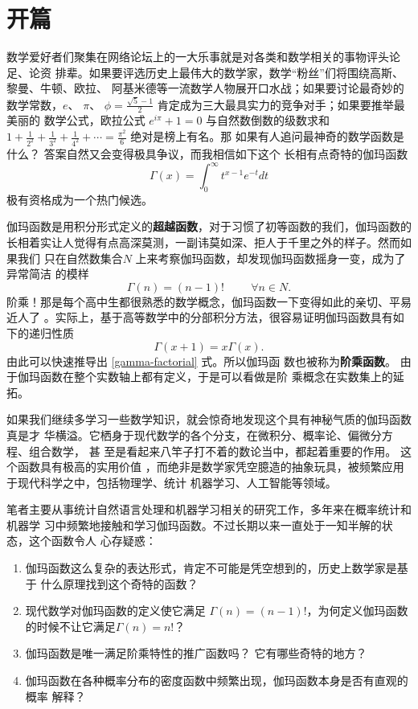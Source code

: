 %

\section{开篇}

数学爱好者们聚集在网络论坛上的一大乐事就是对各类和数学相关的事物评头论足、论资
排辈。如果要评选历史上最伟大的数学家，数学“粉丝”们将围绕高斯、黎曼、牛顿、欧拉、
阿基米德等一流数学人物展开口水战；如果要讨论最奇妙的数学常数，$e$、 $\pi$、
$\phi=\frac{\sqrt{5}-1}{2}$ 肯定成为三大最具实力的竞争对手；如果要推举最美丽的
数学公式，欧拉公式 $e^{i\pi} + 1= 0$  与自然数倒数的级数求和 $ 1 + \frac{1}{2^2} +
\frac{1}{3^2} + \frac{1}{4^2} +  \cdots  = \frac{\pi^2}{6} $ 绝对是榜上有名。那
如果有人追问最神奇的数学函数是什么？ 答案自然又会变得极具争议，而我相信如下这个
长相有点奇特的伽玛函数
$$ \Gamma(x)=\int_0^{\infty}t^{x-1}e^{-t}dt $$
极有资格成为一个热门候选。

伽玛函数是用积分形式定义的{\bf 超越函数}，对于习惯了初等函数的我们，伽玛函数的
长相着实让人觉得有点高深莫测，一副讳莫如深、拒人于千里之外的样子。然而如果我们
只在自然数集合$N$ 上来考察伽玛函数，却发现伽玛函数摇身一变，成为了异常简洁
的模样
\begin{equation}
\label{gamma-factorial}
\Gamma(n) = (n-1)!  \hspace{1cm} \forall n \in N.
\end{equation}
阶乘！那是每个高中生都很熟悉的数学概念，伽玛函数一下变得如此的亲切、平易近人了
。实际上，基于高等数学中的分部积分方法，很容易证明伽玛函数具有如下的递归性质
$$\Gamma(x+1) = x \Gamma(x) .$$ 
由此可以快速推导出 \eqref{gamma-factorial} 式。所以伽玛函
数也被称为{\bf 阶乘函数}。 由于伽玛函数在整个实数轴上都有定义，于是可以看做是阶
乘概念在实数集上的延拓。

如果我们继续多学习一些数学知识，就会惊奇地发现这个具有神秘气质的伽玛函数真是才
华横溢。它栖身于现代数学的各个分支，在微积分、概率论、偏微分方程、组合数学， 甚
至是看起来八竿子打不着的数论当中，都起着重要的作用。 这个函数具有极高的实用价值
，而绝非是数学家凭空臆造的抽象玩具，被频繁应用于现代科学之中，包括物理学、统计
机器学习、人工智能等领域。

笔者主要从事统计自然语言处理和机器学习相关的研究工作，多年来在概率统计和机器学
习中频繁地接触和学习伽玛函数。不过长期以来一直处于一知半解的状态，这个函数令人
心存疑惑：
\begin{enumerate}
\item 伽玛函数这么复杂的表达形式，肯定不可能是凭空想到的，历史上数学家是基于
什么原理找到这个奇特的函数？
\item 现代数学对伽玛函数的定义使它满足 $\Gamma(n) = (n-1)!$，为何定义伽玛函数的时候不让它满足$\Gamma(n) = n!$？
\item 伽玛函数是唯一满足阶乘特性的推广函数吗？ 它有哪些奇特的地方？
\item 伽玛函数在各种概率分布的密度函数中频繁出现，伽玛函数本身是否有直观的概率
解释？
\end{enumerate}

